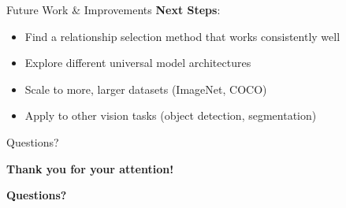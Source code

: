 \documentclass[aspectratio=169]{beamer}
\begin{document}
\begin{frame}{Future Work \& Improvements}
    \textbf{Next Steps}:
    \vspace{0.5em}
    \begin{itemize}
        \item Find a relationship selection method that works consistently well
        \item Explore different universal model architectures
        \item Scale to more, larger datasets (ImageNet, COCO)
        \item Apply to other vision tasks (object detection, segmentation)
    \end{itemize}
\end{frame}

\begin{frame}{Questions?}
    \begin{center}
        \textbf{\Large Thank you for your attention!}

        \vspace{1em}

        \textbf{Questions?}
    \end{center}
\end{frame}
\end{document}
